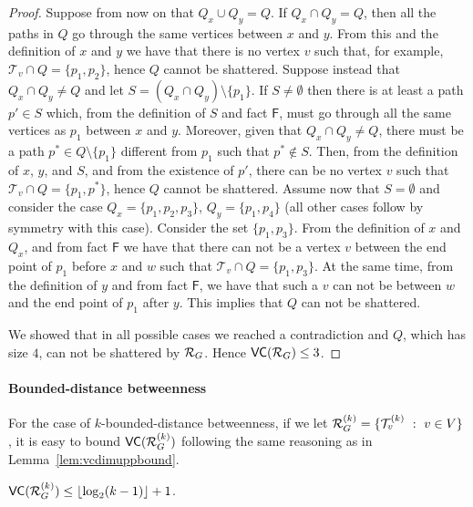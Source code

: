 \begin{proof}
  Suppose from now on that $Q_x\cup Q_y=Q$.  If $Q_x\cap Q_y=Q$, then
  all the paths in $Q$ go through the same vertices between $x$ and $y$. From
  this and the definition of $x$ and $y$ we have that there is no vertex $v$
  such that, for example, $\mathcal{T}_v\cap Q=\{p_1,p_2\}$, hence $Q$ cannot be
  shattered. Suppose instead that $Q_x\cap Q_y\neq Q$ and let $S=(Q_x\cap
  Q_y)\setminus\{p_1\}$. If $S\neq\emptyset$ then there is at least a path
  $p'\in S$ which, from the definition of $S$ and fact $\mathsf{F}$, must go
  through all the same vertices as $p_1$ between $x$ and $y$. Moreover, given
  that $Q_x\cap Q_y\neq Q$, there must be a path $p^*\in Q\setminus\{p_1\}$
  different from $p_1$ such that $p^*\notin S$. Then, from the definition of
  $x$, $y$, and $S$, and from the existence of $p'$, there can be no vertex $v$
  such that $\mathcal{T}_v\cap Q=\{p_1,p^*\}$, hence $Q$ cannot be shattered.
  Assume now that $S=\emptyset$ and consider the case $Q_x=\{p_1,p_2,p_3\}$,
  $Q_y=\{p_1,p_4\}$ (all other cases follow by symmetry with this case).
  Consider the set $\{p_1,p_3\}$. From the definition of $x$ and $Q_x$, and from
  fact $\mathsf{F}$ we have that there can not be a vertex $v$ between the end
  point of $p_1$ before $x$ and $w$ such that $\mathcal{T}_v\cap Q=\{p_1,p_3\}$.
  At the same time, from the definition of $y$ and from fact $\mathsf{F}$, we
  have that such a $v$ can not be between $w$ and the end point of $p_1$ after
  $y$. This implies that $Q$ can not be shattered.

  We showed that in all possible cases we reached a contradiction and $Q$,
  which has size $4$, can not be shattered by $\mathcal{R}_G$. Hence $\mathsf{VC}(\mathcal{R}_G)\le
  3$.
\end{proof}
\fi

\ifproof
\else
\paragraph{Bounded-distance betweenness}
For the case of $k$-bounded-distance betweenness, if we let
$\mathcal{R}_G^{(k)}=\{\mathcal{T}_v^{(k)}~:~ v\in V\}$, it is easy to bound
$\mathsf{VC}(\mathcal{R}_G^{(k)})$ following the same reasoning as in
Lemma~\ref{lem:vcdimuppbound}.
\begin{lemma}\label{lem:vcdimuppboundk}
$\mathsf{VC}(\mathcal{R}_G^{(k)})\le\lfloor\log_2(k-1)\rfloor+1$.
\end{lemma}
\fi

